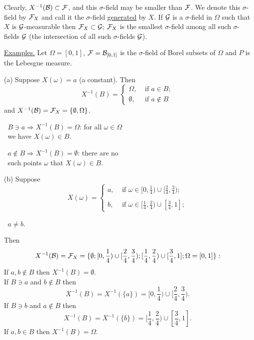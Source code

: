 \documentclass[a4paper,10pt]{article}
\newcommand{\1}[1]{\mathbf{1}_{\{#1\}}}
\begin{document}
Clearly, $X^{-1}({\cal B})\subset{\cal F}$, and this $\sigma$-field may be smaller than $\cal F$. We denote this $\sigma$-field by ${\cal F}_X$ and call it the $\sigma$-field \underline{generated} by $X$. If $\cal G$ is a $\sigma$-field in $\Omega$ such that $X$ is ${\cal G}$-measurable then ${\cal F}_X\subset{\cal G}$; ${\cal F}_X$ is the smallest $\sigma$-field among all such $\sigma$-fields $\cal G$ (the intersection of all such $\sigma$-fields $\cal G$).
\vspace{3mm}

\underline{Examples.} Let $\Omega=[0,1]$, ${\cal F}={\cal B}_{[0,1]}$ is the $\sigma$-field of Borel subsets of $\Omega$ and $P$ is the Lebesgue measure.

(a) Suppose $X(\omega)=a$ (a constant). Then
  $$X^{-1}(B)=\left\{\begin{array}{ll}
\Omega, & \mbox{ if } a\in B; \\ \emptyset, & \mbox{ if } a\notin B \end{array}\right.$$
and $X^{-1}({\cal B})={\cal F}_X=\{\emptyset, \Omega\}$. \vspace{3mm}

$~$\hspace{5cm} $B\ni a\Longrightarrow X^{-1}(B)=\Omega$: for all $\omega\in\Omega$\\
$~$\hspace{5cm} we have $X(\omega)\in B$. \vspace{3mm}

$~$\hspace{5cm} $a\notin B\Longrightarrow X^{-1}(B)=\emptyset$: there are no \\
$~$\hspace{5cm} such points $\omega$ that $X(\omega)\in B$.

(b) Suppose
$$X(\omega)=\left\{\begin{array}{ll} a, & \mbox{ if } \omega\in[0,\frac{1}{4})\cup [\frac{2}{4},\frac{3}{4});\\ \\ b, & \mbox{ if } \omega\in[\frac{1}{4},\frac{2}{4})\cup [\frac{3}{4},1]; \end{array}\right. $$\vspace{1cm}

$~$\hspace{8cm} $a\ne b$. \vspace{1cm}

Then
  $$X^{-1}({\cal B})={\cal F}_X=\{\emptyset; [0,\frac{1}{4})\cup [\frac{2}{4},\frac{3}{4}); [\frac{1}{4},\frac{2}{4})\cup [\frac{3}{4},1]; \Omega=[0,1]\}:$$
If $a,b\notin B$ then $X^{-1}(B)=\emptyset$.\\
If $B\ni a$ and $b\notin B$ then
  $$X^{-1}(B)=X^{-1}(\{a\})=[0,\frac{1}{4})\cup [\frac{2}{4},\frac{3}{4}).$$
If $B\ni b$ and $a\notin B$ then
  $$X^{-1}(B)=X^{-1}(\{b\})=[\frac{1}{4},\frac{2}{4})\cup [\frac{3}{4},1].$$
If $a,b\in B$ then $X^{-1}(B)=\Omega$. \vspace{3mm}
\end{document}
